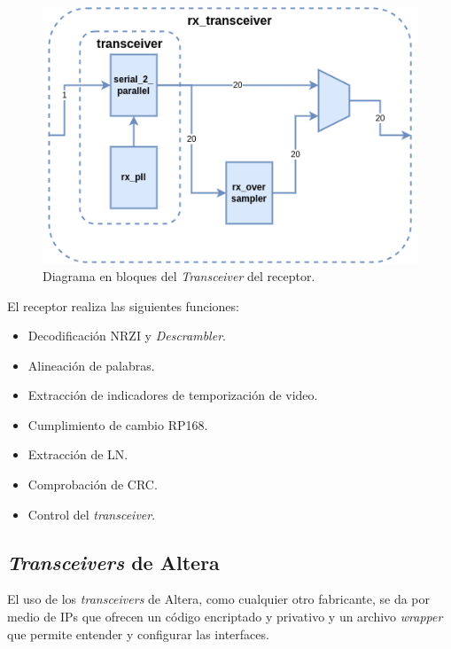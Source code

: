   \begin{figure}[htbp]
      \centering
      \includegraphics[width=\linewidth]{./Figures/rx_xcvr.png}
      \caption{Diagrama en bloques del \textit{Transceiver} del receptor.}\label{fig:rx_xcvr}
  \end{figure}

  El receptor realiza las siguientes funciones:
  \begin{itemize}
      \item Decodificación NRZI y \textit{Descrambler}.
      \item Alineación de palabras.
      \item Extracción de indicadores de temporización de video.
      \item Cumplimiento de cambio RP168.
      \item Extracción de LN\@.
      \item Comprobación de CRC\@.
      \item Control del \textit{transceiver}.
  \end{itemize}

\subsection{\textit{Transceivers} de Altera}

  El uso de los \textit{transceivers} de Altera, como cualquier otro fabricante,
  se da por medio de IPs que ofrecen un código encriptado y privativo y un
  archivo \textit{wrapper} que permite entender y configurar las interfaces.

